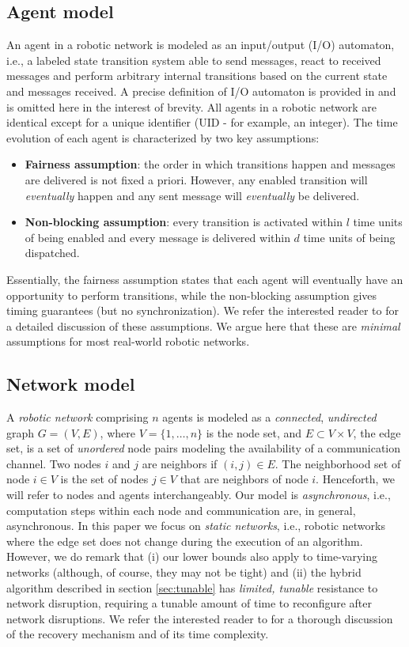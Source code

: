 \documentclass[letterpaper,10pt,conference]{ieeeconf}
\begin{document}
\subsection{Agent model}
An agent in a robotic network is modeled as an input/output (I/O) automaton, i.e., a labeled state transition system able to send messages, react to received messages and perform arbitrary internal transitions based on the current state and  messages received. 
A precise definition of I/O automaton is provided in \cite[pp. 200-204]{NL:96} and is omitted here in the interest of brevity. All agents in a robotic network are identical except for a unique identifier (UID - for example, an integer).  The time evolution of each agent  is characterized by two key assumptions:
\begin{itemize}
\item {\bf Fairness assumption}: the order in which transitions happen and messages are delivered is not fixed a priori. However, any enabled transition will \emph{eventually} happen and any sent message will \emph{eventually} be delivered.
\item {\bf Non-blocking assumption}: every transition is activated within $l$ time units of being enabled and every message is delivered within $d$ time units of being dispatched.
\end{itemize}
Essentially, the fairness assumption states that each  agent will eventually have an opportunity to perform transitions, while the non-blocking assumption gives timing guarantees (but no synchronization). We refer the interested reader to \cite[pages 212-215]{NL:96} for a detailed discussion of these assumptions. We argue here that these are \emph{minimal} assumptions for most  real-world robotic networks. 


\subsection{Network model}
A \emph{robotic network} comprising $n$ agents is modeled as a \emph{connected}, \emph{undirected} graph $G = (V,E)$, where $V = \{1,\ldots, n\}$ is the node set, and $E\subset V\times V$, the edge set,  is a set of \emph{unordered} node pairs modeling the availability of a communication channel. Two nodes $i$ and $j$ are neighbors if $(i, j)\in E$.  The neighborhood set of node $i\in V$ is the set of nodes $j\in V$ that are neighbors of node $i$. Henceforth, we will refer to nodes and agents interchangeably. Our model is \emph{asynchronous}, i.e., computation steps within each node and communication are, in general, asynchronous.
In this paper we focus on \emph{static networks}, i.e., robotic networks where the edge set does not change during the execution of an algorithm. 
However, we do remark that (i) our lower bounds also apply to time-varying networks (although, of course, they may not be tight) and (ii) the hybrid algorithm described in section \ref{sec:tunable} has \emph{limited, tunable} resistance to network disruption, requiring a tunable amount of time to reconfigure after network disruptions. We refer the interested reader to \cite{FR-MP:13} for a thorough discussion of the recovery mechanism and of its time complexity.
\end{document}
